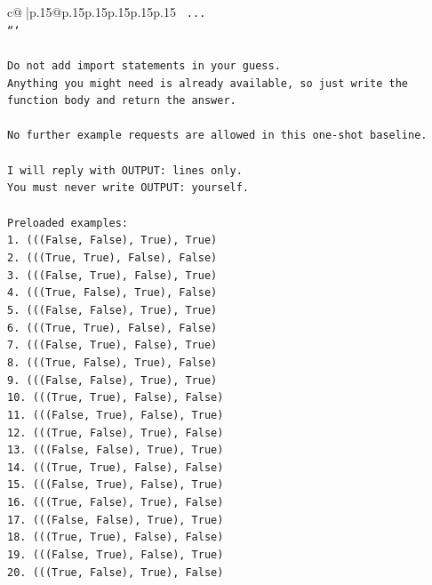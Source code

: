 \documentclass{article}
\begin{document}
{\begin{supertabular}{c@{$\;$}|p{.15\linewidth}@{}p{.15\linewidth}p{.15\linewidth}p{.15\linewidth}p{.15\linewidth}p{.15\linewidth}}
{{{\texttt{    ...} \\
\texttt{```} \\
\\ 
\texttt{Do not add import statements in your guess.} \\
\texttt{Anything you might need is already available, so just write the function body and return the answer.} \\
\\ 
\texttt{No further example requests are allowed in this one{-}shot baseline.} \\
\\ 
\texttt{I will reply with OUTPUT: lines only.} \\
\texttt{You must never write OUTPUT: yourself.} \\
\\ 
\texttt{Preloaded examples:} \\
\texttt{1. (((False, False), True), True)} \\
\texttt{2. (((True, True), False), False)} \\
\texttt{3. (((False, True), False), True)} \\
\texttt{4. (((True, False), True), False)} \\
\texttt{5. (((False, False), True), True)} \\
\texttt{6. (((True, True), False), False)} \\
\texttt{7. (((False, True), False), True)} \\
\texttt{8. (((True, False), True), False)} \\
\texttt{9. (((False, False), True), True)} \\
\texttt{10. (((True, True), False), False)} \\
\texttt{11. (((False, True), False), True)} \\
\texttt{12. (((True, False), True), False)} \\
\texttt{13. (((False, False), True), True)} \\
\texttt{14. (((True, True), False), False)} \\
\texttt{15. (((False, True), False), True)} \\
\texttt{16. (((True, False), True), False)} \\
\texttt{17. (((False, False), True), True)} \\
\texttt{18. (((True, True), False), False)} \\
\texttt{19. (((False, True), False), True)} \\
\texttt{20. (((True, False), True), False)} \\
}}}
\end{supertabular}}
\end{document}
